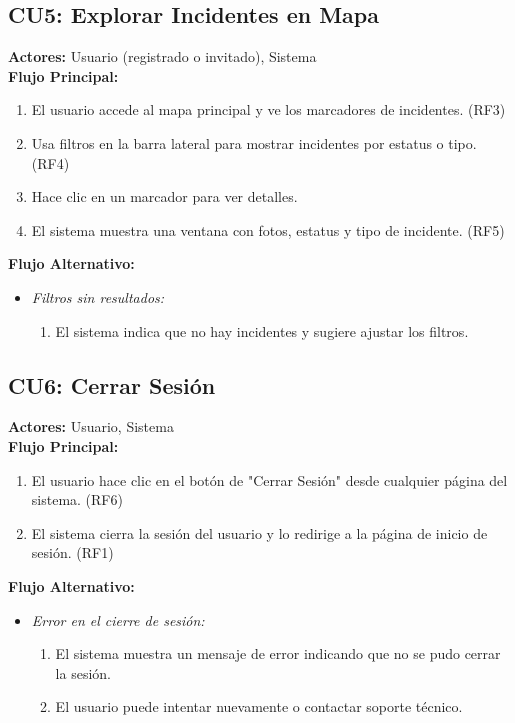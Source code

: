 \subsection*{CU5: Explorar Incidentes en Mapa}
\textbf{Actores:} Usuario (registrado o invitado), Sistema\\
\textbf{Flujo Principal:}
\begin{enumerate}
    \item El usuario accede al mapa principal y ve los marcadores de incidentes. (RF3)
    \item Usa filtros en la barra lateral para mostrar incidentes por estatus o tipo. (RF4)
    \item Hace clic en un marcador para ver detalles.
    \item El sistema muestra una ventana con fotos, estatus y tipo de incidente. (RF5)
\end{enumerate}
\textbf{Flujo Alternativo:}
\begin{itemize}
    \item \textit{Filtros sin resultados:}
    \begin{enumerate}
        \item El sistema indica que no hay incidentes y sugiere ajustar los filtros.
    \end{enumerate}
\end{itemize}

\subsection*{CU6: Cerrar Sesión}
\textbf{Actores:} Usuario, Sistema\\
\textbf{Flujo Principal:}
\begin{enumerate}
    \item El usuario hace clic en el botón de "Cerrar Sesión" desde cualquier página del sistema. (RF6)
    \item El sistema cierra la sesión del usuario y lo redirige a la página de inicio de sesión. (RF1)
\end{enumerate}
\textbf{Flujo Alternativo:}
\begin{itemize}
    \item \textit{Error en el cierre de sesión:}
    \begin{enumerate}
        \item El sistema muestra un mensaje de error indicando que no se pudo cerrar la sesión.
        \item El usuario puede intentar nuevamente o contactar soporte técnico.
    \end{enumerate}
\end{itemize}